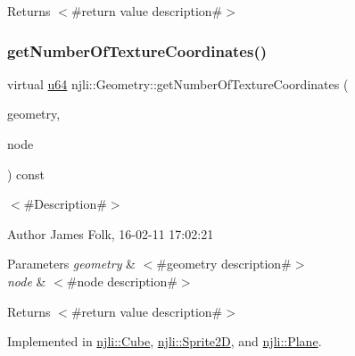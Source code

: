 \begin{DoxyReturn}{Returns}
$<$\#return value description\#$>$ 
\end{DoxyReturn}
\mbox{\label{classnjli_1_1_geometry_a495713b5eea24429df8899cfaa59c832}} 
\subsubsection{\texorpdfstring{get\+Number\+Of\+Texture\+Coordinates()}{getNumberOfTextureCoordinates()}}
{\footnotesize\ttfamily virtual \mbox{\hyperlink{_util_8h_ad758b7a5c3f18ed79d2fcd23d9f16357}{u64}} njli\+::\+Geometry\+::get\+Number\+Of\+Texture\+Coordinates (\begin{DoxyParamCaption}\item[{\mbox{\hyperlink{classnjli_1_1_level_of_detail}{Level\+Of\+Detail}} $\ast$}]{geometry,  }\item[{\mbox{\hyperlink{classnjli_1_1_node}{Node}} $\ast$}]{node }\end{DoxyParamCaption}) const\hspace{0.3cm}{\ttfamily [pure virtual]}}



$<$\#\+Description\#$>$ 

\begin{DoxyAuthor}{Author}
James Folk, 16-\/02-\/11 17\+:02\+:21
\end{DoxyAuthor}

\begin{DoxyParams}{Parameters}
{\em geometry} & $<$\#geometry description\#$>$ \\
\hline
{\em node} & $<$\#node description\#$>$\\
\hline
\end{DoxyParams}
\begin{DoxyReturn}{Returns}
$<$\#return value description\#$>$ 
\end{DoxyReturn}


Implemented in \mbox{\hyperlink{classnjli_1_1_cube_a286147feca746833690715526014f6c2}{njli\+::\+Cube}}, \mbox{\hyperlink{classnjli_1_1_sprite2_d_a68ba69857ee4bb27dbf9072da12046ab}{njli\+::\+Sprite2D}}, and \mbox{\hyperlink{classnjli_1_1_plane_acac9e0af1f82ed239af270c9c50ec4ab}{njli\+::\+Plane}}.


